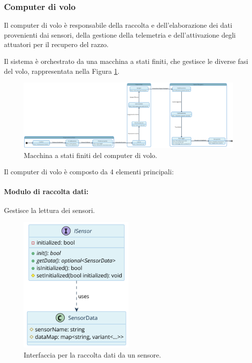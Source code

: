 \documentclass[12pt,a4paper,twoside]{book}
\begin{document}
\subsubsection{Computer di volo}
Il computer di volo è responsabile della raccolta e dell'elaborazione dei dati
provenienti dai sensori, della gestione della telemetria e dell'attivazione degli
attuatori per il recupero del razzo.

Il sistema è orchestrato da una macchina a stati finiti, che gestisce le diverse
fasi del volo, rappresentata nella Figura \ref{fig:flight-computer-fsm}.
\ifdefined\HCode
\else
    \begin{landscape}
        \fi
        \begin{figure}[H]
            \centering
            \vspace*{2cm}  %
            \hspace*{-4cm}
            \includegraphics[width=1.7\textwidth]{img/uml/fsm.png}
            \caption{Macchina a stati finiti del computer di volo.}
            \label{fig:flight-computer-fsm}
            \vspace*{-1cm}  %
        \end{figure}
        \thispagestyle{empty}  %
        \ifdefined\HCode
        \else
    \end{landscape}
\fi

\newpage
Il computer di volo è composto da 4 elementi principali:
\paragraph{\textbf{Modulo di raccolta dati:}} Gestisce la lettura dei sensori.
\begin{figure}[H]
    \centering
    \includegraphics[width=0.5\textwidth]{img/uml/sensor.png}
    \caption{Interfaccia per la raccolta dati da un sensore.}
    \label{fig:flight-computer-data-collection}
\end{figure}
\end{document}
